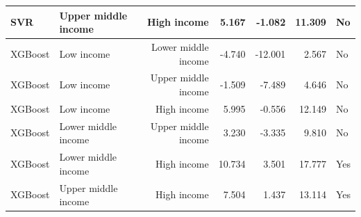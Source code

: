 \begin{table}[htbp]
\begin{tabular}{llrrrr}
        SVR & Upper middle income & High income & 5.167 & -1.082 & 11.309 & No \\
        \midrule
        XGBoost & Low income & Lower middle income & -4.740 & -12.001 & 2.567 & No \\
        XGBoost & Low income & Upper middle income & -1.509 & -7.489 & 4.646 & No \\
        XGBoost & Low income & High income & 5.995 & -0.556 & 12.149 & No \\
        XGBoost & Lower middle income & Upper middle income & 3.230 & -3.335 & 9.810 & No \\
        XGBoost & Lower middle income & High income & 10.734 & 3.501 & 17.777 & Yes \\
        XGBoost & Upper middle income & High income & 7.504 & 1.437 & 13.114 & Yes \\
        \bottomrule
    \end{tabular}
\end{table}